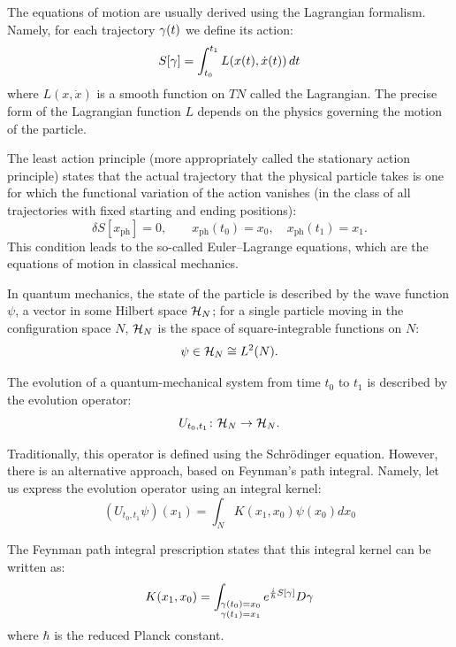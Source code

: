 The equations of motion are usually derived using the Lagrangian formalism.
Namely, for each trajectory $\gamma(t)$ we define its action:
\begin{equation}
	S[\gamma]= \int_{t_0}^{t_1} L(x(t),\dot x(t))\, dt \nonumber
\end{equation}
where $L(x, \dot x)$ is a smooth function on $TN$ called the Lagrangian.
The precise form of
the Lagrangian function $L$ depends on the physics governing the motion of the
particle.

The least action principle (more appropriately called the stationary action
principle) states that the actual trajectory that the physical particle takes
is one for which the functional variation of the action vanishes (in the class
of all trajectories with fixed starting and ending positions):
\begin{equation}\label{e:stationary-path}
	\delta S[x_{\mathrm{ph}}] = 0, \qquad x_{\mathrm{ph}}(t_0) = x_0,\quad x_{\mathrm{ph}}(t_1) = x_1.
\end{equation}
This condition leads to the so-called Euler--Lagrange equations, which are the
equations of motion in classical mechanics.


In quantum mechanics, the state of the particle is described by the wave
function $\psi$, a vector in some Hilbert space $\mathcal{H}_N$; for a single
particle moving in the configuration space $N$, $\mathcal{H}_N$ is the space of
square-integrable functions on $N$:
\begin{equation*}
	\psi \in \mathcal{H}_N \cong L^2(N).
\end{equation*}

The evolution of a quantum-mechanical system from time $t_0$
to $t_1$ is described by the evolution operator:
\begin{equation*}
	U_{t_0,t_1}\colon \mathcal{H}_N \to\mathcal{H}_N.
\end{equation*}

Traditionally, this operator is defined using the Schr\"odinger equation.
However, there is an alternative approach, based on Feynman's path integral.
Namely, let us express the evolution operator using an integral kernel:
\begin{equation}
	(U_{t_0,t_1} \psi)(x_1) = \int_{N} K(x_1,x_0) \psi(x_0) dx_0
\end{equation}

The Feynman path integral prescription states that this integral
kernel can be written as:
\begin{equation}\label{e:feynman1}
	K(x_1,x_0) = \int_{\substack{\gamma(t_0)=x_0 \\
  \gamma(t_1)=x_1}} e^{ \frac{i}{\hbar} S[\gamma] } D\gamma
\end{equation}
where $\hbar$ is the reduced Planck constant.

